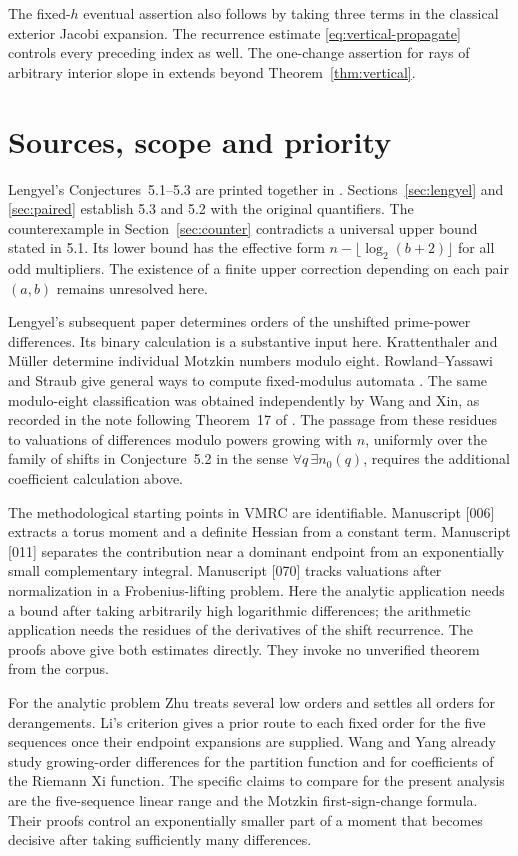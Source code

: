 \documentclass[11pt,a4paper]{article}
\begin{document}
The fixed-$h$ eventual assertion also follows by taking three terms in the
classical exterior Jacobi expansion. The recurrence estimate
\eqref{eq:vertical-propagate} controls every preceding index as well. The
one-change assertion for rays of arbitrary interior slope in \cite[Sec.~4]{wzc}
extends beyond Theorem~\ref{thm:vertical}.
\section{Sources, scope and priority}\label{sec:audit}
Lengyel's Conjectures~5.1--5.3 are printed together in
\cite[pp.~132--133]{lengyel13}. Sections~\ref{sec:lengyel} and
\ref{sec:paired} establish 5.3 and 5.2 with the original quantifiers.
The counterexample in Section~\ref{sec:counter} contradicts a universal
upper bound stated in 5.1. Its lower bound has the effective form
$n-\lfloor\log_2(b+2)\rfloor$ for all odd multipliers.
The existence of a finite upper correction depending on each pair $(a,b)$
remains unresolved here.

Lengyel's subsequent paper \cite{lengyel14} determines orders of the
unshifted prime-power differences. Its binary calculation is a substantive
input here. Krattenthaler and M\"uller \cite{km18} determine individual
Motzkin numbers modulo eight. Rowland--Yassawi and Straub give general ways to compute fixed-modulus
automata \cite{ry,straub}. The same modulo-eight classification was
obtained independently by Wang and Xin, as recorded in the note following
Theorem~17 of \cite{km18}. The passage from these residues to valuations
of differences modulo powers growing with $n$, uniformly over the
family of shifts in Conjecture~5.2 in the sense $\forall q\,\exists n_0(q)$,
requires the additional coefficient calculation above.

The methodological starting points in VMRC \cite{corpus} are identifiable.
Manuscript [006] extracts a torus moment and a definite Hessian from a
constant term. Manuscript [011] separates the contribution near a dominant
endpoint from an exponentially small complementary integral. Manuscript
[070] tracks valuations after normalization in a Frobenius-lifting
problem. Here the analytic application needs a bound after taking
arbitrarily high logarithmic differences; the arithmetic application needs
the residues of the derivatives of the shift recurrence. The proofs above
give both estimates directly. They invoke no unverified theorem from the corpus.

For the analytic problem Zhu \cite{zhu} treats several low orders and
settles all orders for derangements. Li's criterion \cite{li} gives a
prior route to each fixed order for the five sequences once their endpoint
expansions are supplied. Wang and Yang \cite{wy} already study
growing-order differences for the partition function and for coefficients
of the Riemann Xi function. The specific claims to compare for the present
analysis are the five-sequence linear range and the Motzkin first-sign-change
formula. Their proofs control an exponentially smaller part of a moment
that becomes decisive after taking sufficiently many differences.
\end{document}
